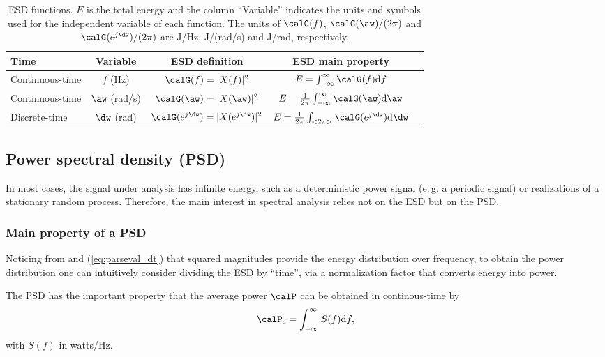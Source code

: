 \begin{table}
\centering
\caption{ESD functions. $E$ is the total energy and the column ``Variable'' indicates the units and symbols used for the independent variable of each function.
The units of $\calG(f)$, $\calG(\aw)/(2 \pi)$ and $\calG(e^{j\dw})/(2 \pi)$ are J/Hz, J/(rad/s) and J/rad, respectively.\label{tab:esd_functions}}
\begin{tabular}{|l|c|c|c|c|}
\hline
Time & Variable & ESD definition & ESD main property \\ \hline
Continuous-time & $f$ (Hz) & $\calG(f) = |X(f)|^2$ & $E = \int_{-\infty}^{\infty} \calG(f) \textrm{d}f$  \\ \hline
Continuous-time & $\aw$ (rad/s) & $\calG(\aw) = |X(\aw)|^2$ & $E=\frac{1}{2 \pi}\int_{-\infty}^{\infty} \calG(\aw) \textrm{d}\aw$  \\ \hline
Discrete-time & $\dw$ (rad) & $\calG(e^{j\dw}) = |X(e^{j\dw})|^2$ & $E=\frac{1}{2 \pi}\int_{<2 \pi>} \calG(e^{j\dw}) \textrm{d}\dw$  \\ \hline
\end{tabular}
\end{table}


\subsection{Power spectral density (PSD)}
\label{sec:psd}

In most cases, the signal under analysis has infinite energy, such as a deterministic power signal (e.\,g. a periodic signal) or realizations of a stationary random process. Therefore, the main interest in spectral analysis relies not on the ESD but on the PSD.

\subsubsection{Main property of a PSD}

Noticing from  and (\ref{eq:parseval_dt}) that squared magnitudes provide the energy distribution over frequency, to obtain the power distribution one can intuitively consider dividing the ESD by ``time'', via a normalization factor that converts energy into power.

The PSD 
has the important property that the average power $\calP$ can be obtained in continous-time by
\begin{equation}
\calP_c = \int_{- \infty}^\infty S(f) \textrm{d}f,
\label{eq:psd_integration_continuousTime}
\end{equation}
with $S(f)$ in watts/Hz.

